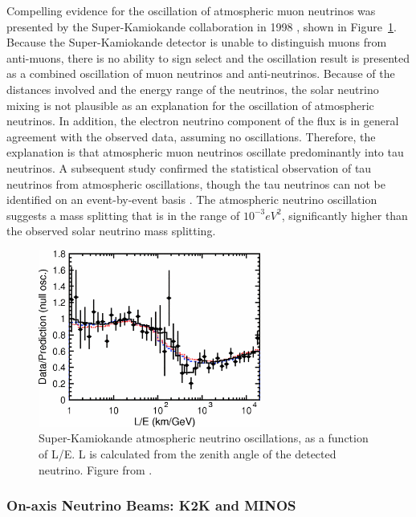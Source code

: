 Compelling evidence for the oscillation of atmospheric muon neutrinos was presented by the Super-Kamiokande collaboration in 1998 \cite{PhysRevLett.81.1562}, shown in Figure~\ref{fig:super_k_oscillations}.  Because the Super-Kamiokande detector is unable to distinguish muons from anti-muons, there is no ability to sign select and the oscillation result is presented as a combined oscillation of muon neutrinos and anti-neutrinos.  Because of the distances involved and the energy range of the neutrinos, the solar neutrino mixing is not plausible as an explanation for the oscillation of atmospheric neutrinos.  In addition, the electron neutrino component of the flux is in general agreement with the observed data, assuming no oscillations.  Therefore, the explanation is that atmospheric muon neutrinos oscillate predominantly into tau neutrinos.  A subsequent study confirmed the statistical observation of tau neutrinos from atmospheric oscillations, though the tau neutrinos can not be identified on an event-by-event basis \cite{PhysRevLett.110.181802}.  The atmospheric neutrino oscillation suggests a mass splitting that is in the range of $10^{-3} eV^2$, significantly higher than the observed solar neutrino mass splitting.

\begin{figure}[htbp]
  \centering
  \includegraphics[width=0.65\textwidth]{intro_figures/superk_atmospheric_oscillation.png}
  \caption[Super-K Neutrino Oscillations]{Super-Kamiokande atmospheric neutrino oscillations, as a function of L/E.  L is calculated from the zenith angle of the detected neutrino. Figure from \cite{PhysRevLett.93.101801}.}
  \label{fig:super_k_oscillations}
\end{figure}

\subsubsection{On-axis Neutrino Beams: K2K and MINOS}

